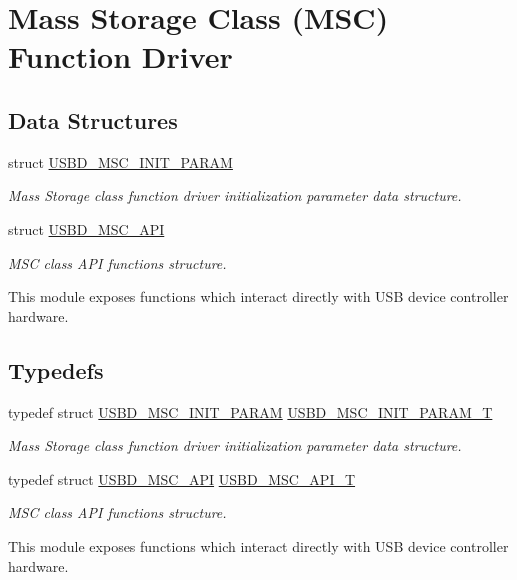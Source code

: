 \hypertarget{group__USBD__MSC}{\section{Mass Storage Class (M\-S\-C) Function Driver}
\label{group__USBD__MSC}
}
\subsection*{Data Structures}
\begin{DoxyCompactItemize}
\item 
struct \hyperlink{structUSBD__MSC__INIT__PARAM}{U\-S\-B\-D\-\_\-\-M\-S\-C\-\_\-\-I\-N\-I\-T\-\_\-\-P\-A\-R\-A\-M}
\begin{DoxyCompactList}\small\item\em Mass Storage class function driver initialization parameter data structure. \end{DoxyCompactList}\item 
struct \hyperlink{structUSBD__MSC__API}{U\-S\-B\-D\-\_\-\-M\-S\-C\-\_\-\-A\-P\-I}
\begin{DoxyCompactList}\small\item\em M\-S\-C class A\-P\-I functions structure.

This module exposes functions which interact directly with U\-S\-B device controller hardware. \end{DoxyCompactList}\end{DoxyCompactItemize}
\subsection*{Typedefs}
\begin{DoxyCompactItemize}
\item 
typedef struct \hyperlink{structUSBD__MSC__INIT__PARAM}{U\-S\-B\-D\-\_\-\-M\-S\-C\-\_\-\-I\-N\-I\-T\-\_\-\-P\-A\-R\-A\-M} \hyperlink{group__USBD__MSC_ga01cbe726c0ee97ee44661ca88d7e8fbd}{U\-S\-B\-D\-\_\-\-M\-S\-C\-\_\-\-I\-N\-I\-T\-\_\-\-P\-A\-R\-A\-M\-\_\-\-T}
\begin{DoxyCompactList}\small\item\em Mass Storage class function driver initialization parameter data structure. \end{DoxyCompactList}\item 
typedef struct \hyperlink{structUSBD__MSC__API}{U\-S\-B\-D\-\_\-\-M\-S\-C\-\_\-\-A\-P\-I} \hyperlink{group__USBD__MSC_ga521bb0e0edf4060aeb10827c6c29f7cf}{U\-S\-B\-D\-\_\-\-M\-S\-C\-\_\-\-A\-P\-I\-\_\-\-T}
\begin{DoxyCompactList}\small\item\em M\-S\-C class A\-P\-I functions structure.

This module exposes functions which interact directly with U\-S\-B device controller hardware. \end{DoxyCompactList}\end{DoxyCompactItemize}


